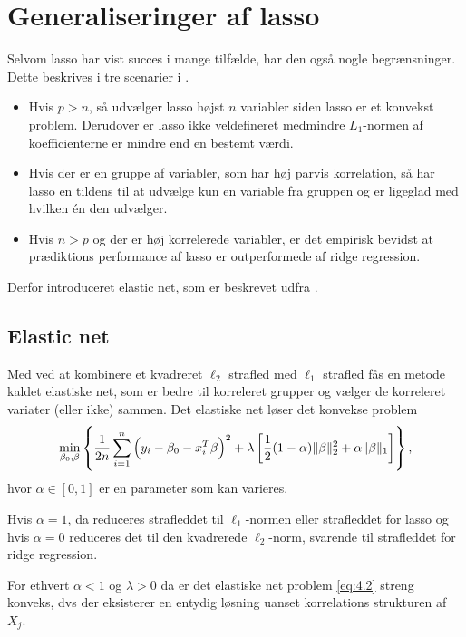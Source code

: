 \section{Generaliseringer af lasso}

Selvom lasso har vist succes i mange tilfælde, har den også nogle begrænsninger. Dette beskrives i tre scenarier i \citep{hui_hastie} . 
\begin{itemize}
\item Hvis $p>n$, så udvælger lasso højst $n$ variabler siden lasso er et konvekst problem. Derudover er lasso ikke veldefineret medmindre $L_1$-normen af koefficienterne er mindre end en bestemt værdi. 
\item Hvis der er en gruppe af variabler, som har høj parvis korrelation, så har lasso en tildens til at udvælge kun en variable fra gruppen og er ligeglad med hvilken én den udvælger. 
\item Hvis $n>p$ og der er høj korrelerede variabler, er det empirisk bevidst at prædiktions performance af lasso er outperformede af ridge regression. 
\end{itemize}
Derfor introduceret elastic net, som er beskrevet udfra  \citep{hastie}.
\subsection{Elastic net}
Med ved at kombinere et kvadreret $\ell_2$ strafled med $\ell_1$ strafled fås en metode kaldet elastiske net, som er bedre til korreleret grupper og vælger de korreleret variater (eller ikke) sammen.
Det elastiske net løser det konvekse problem
\begin{align}
\min_{\beta_0, \beta} \cbr{\frac{1}{2n} \sum_{i=1}^n \del{y_i - \beta_0 - x_{i}^T \beta}^2 + \lambda \sbr{\frac{1}{2} (1- \alpha) \Vert \beta \Vert_2^2 + \alpha \Vert \beta \Vert_1}}, \label{eq:4.2}
\end{align}
hvor $\alpha \in [0,1]$ er en parameter som kan varieres. 

Hvis $\alpha=1$, da reduceres strafleddet til $\ell_1$-normen eller strafleddet for lasso og hvis $\alpha=0$ reduceres det til den kvadrerede $\ell_2$-norm, svarende til strafleddet for ridge regression.

For ethvert $\alpha<1$ og $\lambda>0$ da er det elastiske net problem \eqref{eq:4.2} streng konveks, dvs der eksisterer en entydig løsning uanset korrelations strukturen af $X_j$.


